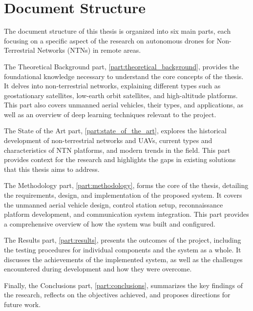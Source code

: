 \chapter{Document Structure}\label{ch:document_structure}

The document structure of this thesis is organized into six main parts, each focusing on a specific aspect of the research on autonomous drones for Non-Terrestrial Networks (NTNs) in remote areas.

The Theoretical Background part, \cref{part:theoretical_background}, provides the foundational knowledge necessary to understand the core concepts of the thesis. It delves into non-terrestrial networks, explaining different types such as geostationary satellites, low-earth orbit satellites, and high-altitude platforms. This part also covers unmanned aerial vehicles, their types, and applications, as well as an overview of deep learning techniques relevant to the project.

The State of the Art part, \cref{part:state_of_the_art}, explores the historical development of non-terrestrial networks and UAVs, current types and characteristics of NTN platforms, and modern trends in the field. This part provides context for the research and highlights the gaps in existing solutions that this thesis aims to address.

The Methodology part, \cref{part:methodology}, forms the core of the thesis, detailing the requirements, design, and implementation of the proposed system. It covers the unmanned aerial vehicle design, control station setup, reconnaissance platform development, and communication system integration. This part provides a comprehensive overview of how the system was built and configured.

The Results part, \cref{part:results}, presents the outcomes of the project, including the testing procedures for individual components and the system as a whole. It discusses the achievements of the implemented system, as well as the challenges encountered during development and how they were overcome.

Finally, the Conclusions part, \cref{part:conclusions}, summarizes the key findings of the research, reflects on the objectives achieved, and proposes directions for future work.
